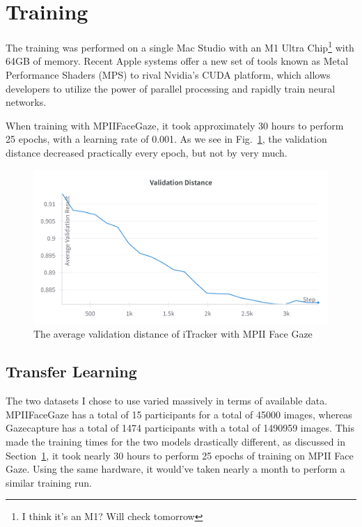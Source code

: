 \documentclass[twocolumn]{report}
\begin{document}
\section{Training}
\label{sec:training}

The training was performed on a single Mac Studio with an M1 Ultra Chip\footnote{I think it's an M1? Will check tomorrow} with 64GB of memory. Recent Apple systems offer a new set of tools known as Metal Performance Shaders (MPS) to rival Nvidia's CUDA platform, which allows developers to utilize the power of parallel processing and rapidly train neural networks. 

When training with MPIIFaceGaze, it took approximately 30 hours to perform 25 epochs, with a learning rate of 0.001. As we see in Fig.~\ref{fig:val}, the validation distance decreased practically every epoch, but not by very much. 

\begin{figure}
    \begin{center}
        \includegraphics[scale=0.04]{../assets/mpii-val.png}
    \end{center}
    \caption{The average validation distance of iTracker with MPII Face Gaze}
    \label{fig:val}
\end{figure}

\subsection{Transfer Learning}

The two datasets I chose to use varied massively in terms of available data. MPIIFaceGaze has a total of 15 participants for a total of 45000 images, whereas Gazecapture has a total of 1474 participants with a total of 1490959 images. This made the training times for the two models drastically different, as discussed in Section~\ref{sec:training}, it took nearly 30 hours to perform 25 epochs of training on MPII Face Gaze. Using the same hardware, it would've taken nearly a month to perform a similar training run. 
\end{document}

